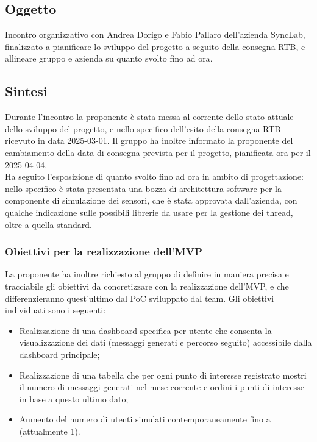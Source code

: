 \documentclass[10pt]{article}
\begin{document}
\subsection{Oggetto}
Incontro organizzativo con Andrea Dorigo e Fabio Pallaro dell'azienda SyncLab, finalizzato a pianificare lo sviluppo del progetto a seguito della consegna RTB, 
e allineare gruppo e azienda su quanto svolto fino ad ora.

\subsection{Sintesi}
Durante l'incontro la proponente è stata messa al corrente dello stato attuale dello sviluppo del progetto, e nello specifico dell'esito della consegna RTB ricevuto in data
2025-03-01. Il gruppo ha inoltre informato la proponente del cambiamento della data di consegna prevista per il progetto, pianificata ora per il 2025-04-04.\\
Ha seguito l'esposizione di quanto svolto fino ad ora in ambito di progettazione: nello specifico è stata presentata una bozza di architettura software per la componente
di simulazione dei sensori, che è stata approvata dall'azienda, con qualche indicazione sulle possibili librerie da usare per la gestione dei thread, oltre a quella 
standard.\\

\subsubsection{Obiettivi per la realizzazione dell'MVP}
La proponente ha inoltre richiesto al gruppo di definire in maniera precisa e tracciabile gli obiettivi da concretizzare con la realizzazione dell'MVP, e che differenzieranno
quest'ultimo dal PoC sviluppato dal team. Gli obiettivi individuati sono i seguenti:
\begin{itemize}
    \item Realizzazione di una dashboard specifica per utente che consenta la visualizzazione dei dati (messaggi generati e percorso seguito) accessibile dalla dashboard 
    principale;
    \item Realizzazione di una tabella che per ogni punto di interesse registrato mostri il numero di messaggi generati nel mese corrente e ordini i punti di interesse in base a questo ultimo dato;
    \item Aumento del numero di utenti simulati contemporaneamente fino a  (attualmente 1).
\end{itemize}
\end{document}
